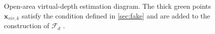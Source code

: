 \documentclass[letterpaper, 10 pt, journal, twoside]{IEEEtran}
\newcommand{\cfix}[1]{%
  \texorpdfstring{\textcolor{black}{#1}}{#1}%
}
\begin{document}
\begin{figure}[!h]
  \centering
  \caption{{Open-area virtual-depth estimation diagram. The thick green points $\mathbf{x}_{vir, k}$ satisfy the condition defined in \autoref{sec:fake} and are added to the construction of $\mathcal{F}_d$\cfix{.}}}
  \label{fig:ofs}
\end{figure}
\end{document}
